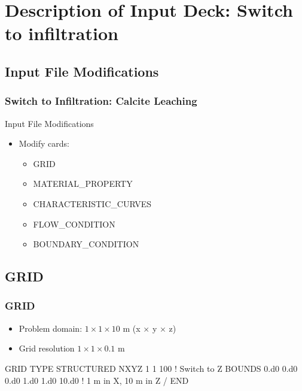 \documentclass{beamer}
\newcommand\bluecomment[1]{{{\color{blue} #1}}}
\newcommand\magentacomment[1]{{{\color{magenta} #1}}}
\begin{document}
\section{Description of Input Deck: Switch to infiltration}

\subsection{Input File Modifications}

\begin{frame}[fragile]\frametitle{Switch to Infiltration: Calcite Leaching}

Input File Modifications
\begin{itemize}
\item Modify cards:
  \begin{itemize}
    \item GRID
    \item MATERIAL\_PROPERTY
    \item CHARACTERISTIC\_CURVES
    \item FLOW\_CONDITION
    \item BOUNDARY\_CONDITION
   \end{itemize}
\end{itemize}

\end{frame}

\subsection{GRID}
\begin{frame}\frametitle{GRID}

\begin{itemize}
  \item Problem domain: $1 \times 1 \times 10$ m (x $\times$ y $\times$ z)
  \item Grid resolution $1 \times 1 \times 0.1$ m
\end{itemize}

\begin{semiverbatim}
GRID
  TYPE STRUCTURED
  NXYZ \magentacomment{1} 1 \magentacomment{100}     \bluecomment{! Switch to Z}
  BOUNDS
    0.d0 0.d0 0.d0
    \magentacomment{1.d0} 1.d0 \magentacomment{10.d0}  \bluecomment{! 1 m in X, 10 m in Z}
  /
END
\end{semiverbatim}

\end{frame}
\end{document}
